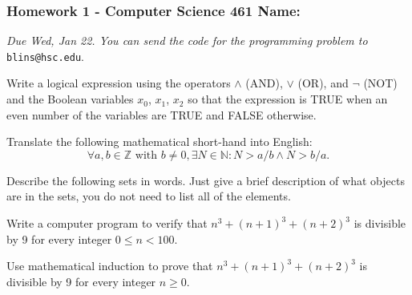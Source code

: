 \documentclass[12pt]{exam}
\newcommand{\Z}{\mathbb{Z}}
\newcommand{\N}{\mathbb{N}}
\begin{document}
\pagestyle{empty}
\subsubsection*{Homework 1 - Computer Science 461 \hfill Name: \underline{\hspace*{2in}}}

\textit{Due Wed, Jan 22. You can send the code for the programming problem to }\verb|blins@hsc.edu|.

\begin{questions}


\question Write a logical expression using the operators $\wedge$ (AND), $\vee$ (OR), and $\neg$ (NOT) and the Boolean variables $x_0$, $x_1$, $x_2$ so that the expression is TRUE when an even number of the variables are TRUE and FALSE otherwise.   
\vfill

\question Translate the following mathematical short-hand into English: 
$$\forall a, b \in \Z \text{ with } b \ne 0, \exists N \in \N: N > a/b \wedge N > b/a.$$
\vfill

\question Describe the following sets in words.  Just give a brief description of what objects are in the sets, you do not need to list all of the elements. 

\question Write a computer program to verify that $n^3 + (n+1)^3 + (n+2)^3$ is divisible by 9 for every integer $0 \le n < 100$.  
\vfill

\question Use mathematical induction to prove that $n^3 + (n+1)^3 + (n+2)^3$ is divisible by 9 for every integer $n \ge 0$.  
\vfill


\end{questions}
\end{document}
